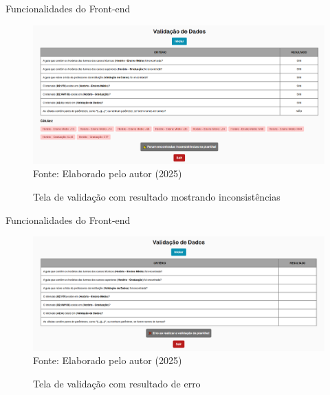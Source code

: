 \begin{frame}{Funcionalidades do Front-end}
    \begin{figure}
        \centering
        \vspace{-0.5cm}
        \caption{Tela de validação com resultado mostrando inconsistências}
        \vspace{-0.2cm}
        \includegraphics[width=1\textwidth]{figuras/front-23.png}
        \\ %
        \footnotesize Fonte: Elaborado pelo autor (2025)
    \end{figure}
\end{frame}

\begin{frame}{Funcionalidades do Front-end}
    \begin{figure}
        \centering
        \vspace{-0.5cm}
        \caption{Tela de validação com resultado de erro}
        \vspace{-0.2cm}
        \includegraphics[width=1\textwidth]{figuras/front-24.png}
        \\ %
        \footnotesize Fonte: Elaborado pelo autor (2025)
    \end{figure}
\end{frame}

